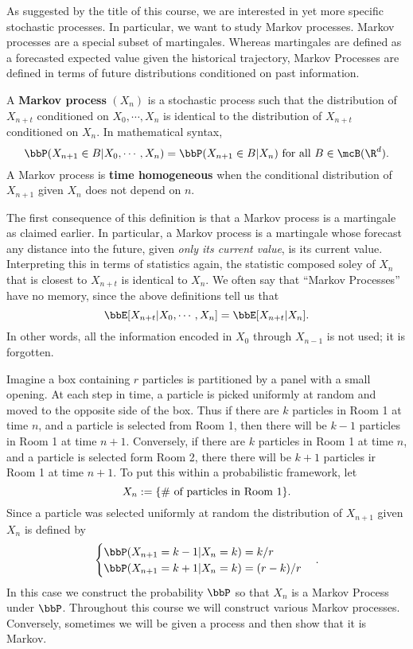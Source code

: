 \documentclass{report}
\begin{document}
As suggested by the title of this course, we are interested in yet more specific stochastic processes.  In particular, we want to study Markov processes.  Markov processes are a special subset of martingales.  Whereas martingales are defined as a forecasted expected value given the historical trajectory, Markov Processes are defined in terms of future distributions conditioned on past information.  

A \textbf{Markov process}  $(X_n)$ is a stochastic process such that the distribution of $X_{n+t}$ conditioned on $X_0, \cdots, X_n$ is identical to the distribution of $X_{n+t}$ conditioned on $X_n$.  In mathematical syntax,
\[
\bbP(X_{n+1} \in B | X_0, \cdots, X_n) = \bbP(X_{n+1} \in B | X_n) \textmd{ for all } B \in \mcB(\R^d).
\]
A Markov process is  \textbf{time homogeneous} when the conditional distribution of $X_{n+1}$ given $X_n$ does not depend on $n$.

The first consequence of this definition is that a Markov process is a martingale as claimed earlier.  In particular, a Markov process is a martingale whose forecast any distance into the future, given \emph{only its current value}, is its current value.  Interpreting this in terms of statistics again, the  statistic composed soley of $X_n$ that is closest to $X_{n+t}$ is identical to $X_n$.  We often say that ``Markov Processes'' have no memory, since the above definitions tell us that
\[
\bbE[X_{n+t} | X_0, \cdots, X_n] = \bbE[X_{n+t} | X_n ].
\]
In other words, all the information encoded in $X_0$ through $X_{n-1}$ is not used; it is forgotten.

\begin{example}
Imagine a box containing $r$ particles is partitioned by a panel with a small opening.  At each step in time, a particle is picked uniformly at random and moved to the opposite side of the box.  Thus if there are $k$ particles in Room 1 at time $n$, and a particle is selected from Room 1, then there will be $k-1$ particles in Room 1 at time $n+1$.  Conversely, if there are $k$ particles in Room 1 at time $n$, and a particle is selected form Room 2, there there will be $k+1$ particles ir Room 1 at time $n+1$.  To put this within a probabilistic framework, let
\[
X_n := \{ \# \textmd{ of particles in Room 1} \}.
\]
Since a particle was selected uniformly at random the  distribution of $X_{n+1}$ given $X_n$ is defined by
\[
\begin{cases}
\bbP(X_{n+1} = k-1 | X_n = k) = k/r \\
\bbP(X_{n+1} = k+1 | X_n = k) = (r-k)/r
\end{cases}.
\]
In this case we construct the probability $\bbP$ so that $X_n$ is a Markov Process under $\bbP$.  Throughout this course we will construct various Markov processes.  Conversely, sometimes we will be given a process and then show that it is Markov.
\end{example}
\end{document}
